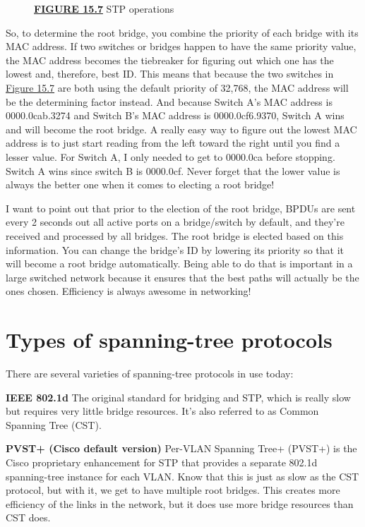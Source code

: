 \begin{figure}
\centering
\caption{{\protect\hyperlink{c15.xhtmlux5cux23figureanchor15-7}{\textbf{FIGURE
15.7}} STP operations}}
\end{figure}

So, to determine the root bridge, you combine the priority of each
bridge with its MAC address. If two switches or bridges happen to have
the same priority value, the MAC address becomes the tiebreaker for
figuring out which one has the lowest and, therefore, best ID. This
means that because the two switches in
\protect\hyperlink{c15.xhtmlux5cux23figure15-7}{Figure 15.7} are both
using the default priority of 32,768, the MAC address will be the
determining factor instead. And because Switch A's MAC address is
0000.0cab.3274 and Switch B's MAC address is 0000.0cf6.9370, Switch
A wins and will
become the root bridge. A really easy way to figure out the lowest MAC
address is to just start reading from the left toward the right until
you find a lesser value. For Switch A, I only needed to get to 0000.0ca
before stopping. Switch A wins since switch B is 0000.0cf. Never forget
that the lower value is always the better one when it comes to electing
a root bridge!

I want to point out that prior to the election of the root bridge, BPDUs
are sent every 2 seconds out all active ports on a bridge/switch by
default, and they're received and processed by all bridges. The root
bridge is elected based on this information. You can change the bridge's
ID by lowering its priority so that it will become a root bridge
automatically. Being able to do that is important in a large switched
network because it ensures that the best paths will actually be the ones
chosen. Efficiency is always awesome in networking!

\section{Types of spanning-tree protocols}

There are several varieties of spanning-tree protocols in use today:

\textbf{IEEE 802.1d} The original standard for bridging and STP, which
is really slow but requires very little bridge resources. It's also
referred to as Common Spanning Tree (CST).

\textbf{PVST+ (Cisco default version)} Per-VLAN Spanning Tree+ (PVST+)
is the Cisco proprietary enhancement for STP that provides a separate
802.1d spanning-tree instance for each VLAN. Know that this is just as
slow as the CST protocol, but with it, we get to have multiple root
bridges. This creates more efficiency of the links in the network, but
it does use more bridge resources than CST does.

